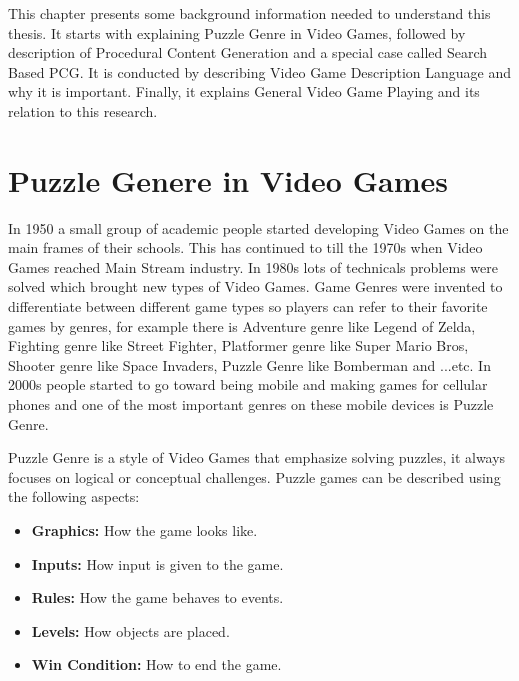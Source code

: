 This chapter presents some background information needed to understand this thesis. It starts with explaining Puzzle Genre in Video Games, followed by description of Procedural Content Generation and a special case called Search Based PCG. It is conducted by describing Video Game Description Language and why it is important. Finally, it explains General Video Game Playing and its relation to this research.

\section{Puzzle Genere in Video Games}
In 1950 a small group of academic people started developing Video Games on the main frames of their schools. This has continued to till the 1970s when Video Games reached Main Stream industry. In 1980s lots of technicals problems were solved which brought new types of Video Games. Game Genres were invented to differentiate between different game types so players can refer to their favorite games by genres, for example there is Adventure genre like Legend of Zelda, Fighting genre like Street Fighter, Platformer genre like Super Mario Bros, Shooter genre like Space Invaders, Puzzle Genre like Bomberman and ...etc. In 2000s people started to go toward being mobile and making games for cellular  phones and one of the most important genres on these mobile devices is Puzzle Genre\cite{pcgHistory}.\\\par

Puzzle Genre is a style of Video Games that emphasize solving puzzles, it always focuses on logical or conceptual challenges. Puzzle games can be described using the following aspects:
\begin{itemize} \itemsep0pt \parskip0pt 
	\item \textbf{Graphics:} How the game looks like.
  	\item \textbf{Inputs:} How input is given to the game.
  	\item \textbf{Rules:} How the game behaves to events.
  	\item \textbf{Levels:} How objects are placed.
  	\item \textbf{Win Condition:} How to end the game.
\end{itemize}


